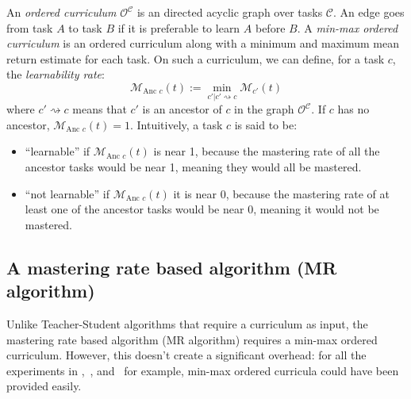 \documentclass{article}
\begin{document}
An \textit{ordered curriculum} \(\mathcal{O}^{\mathcal{C}}\) is an directed acyclic graph over tasks \(\mathcal{C}\). An edge goes from task \(A\) to task \(B\) if it is preferable to learn \(A\) before \(B\). A \textit{min-max ordered curriculum} is an ordered curriculum along with a minimum and maximum mean return estimate for each task. On such a curriculum, we can define, for a task \(c\), the \textit{learnability rate}:
$$\mathcal{M}_{\text{Anc }c}(t):= \min_{c' |c'\rightsquigarrow c} \mathcal{M}_{c'}(t)$$
where \(c'\rightsquigarrow c\) means that \(c'\) is an ancestor of \(c\) in the graph \(\mathcal{O}^{\mathcal{C}}\). If \(c\) has no ancestor, \(\mathcal{M}_{\text{Anc }c}(t)=1\). Intuitively, a task \(c\) is said to be:
\begin{itemize}
\item ``learnable'' if \(\mathcal{M}_{\text{Anc }c}(t)\) is near 1, because the mastering rate of all the ancestor tasks would be near 1, meaning they would all be mastered.
\item ``not learnable'' if \(\mathcal{M}_{\text{Anc }c}(t)\) it is near 0, because the mastering rate of at least one of the ancestor tasks would
be near 0, meaning it would not be mastered.
\end{itemize}

\subsection{A mastering rate based algorithm (MR algorithm)}\label{sec:mr-alg}


Unlike Teacher-Student algorithms that require a curriculum as input, the mastering rate based algorithm (MR algorithm) requires a min-max ordered curriculum. However, this doesn't create a significant overhead: for all the experiments in \citep{matiisen2017teacher},~\citep{graves2017automated}, and~\citep{fournier2018} for example, min-max ordered curricula could have been provided easily.
\end{document}
